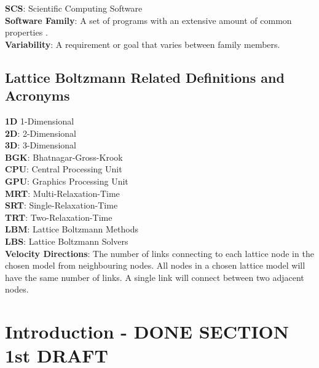 \documentclass[12pt, notitlepage]{article}
\begin{document}
\begin{singlespace}
\noindent\textbf{SCS}: Scientific Computing Software\\

\noindent\textbf{Software Family}: A set of programs with an extensive amount of common properties \cite{parnas1976design}.\\

\noindent\textbf{Variability}: A requirement or goal that varies between family members.

\newpage
\subsection*{Lattice Boltzmann Related Definitions and Acronyms}

\noindent\textbf{1D} 1-Dimensional\\

\noindent\textbf{2D}: 2-Dimensional\\

\noindent\textbf{3D}: 3-Dimensional\\

\noindent\textbf{BGK}: Bhatnagar-Gross-Krook \citep{bhatnagar1954model}\\

\noindent\textbf{CPU}: Central Processing Unit\\

\noindent\textbf{GPU}: Graphics Processing Unit\\

\noindent\textbf{MRT}: Multi-Relaxation-Time\\

\noindent\textbf{SRT}: Single-Relaxation-Time\\

\noindent\textbf{TRT}: Two-Relaxation-Time\\

\noindent\textbf{LBM}: Lattice Boltzmann Methods\\

\noindent\textbf{LBS}: Lattice Boltzmann Solvers\\

\noindent\textbf{Velocity Directions}: The number of links connecting to each lattice node in the chosen model from neighbouring nodes. All nodes in a chosen lattice model will have the same number of links. A single link will connect between two adjacent nodes.


\end{singlespace}
\newpage
{}
\section{Introduction - DONE SECTION 1st DRAFT}
\end{document}

